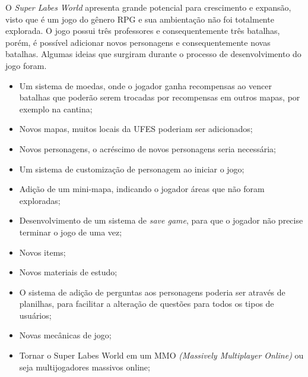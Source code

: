 
O \textit{Super Labes World} apresenta grande potencial para crescimento e expansão, visto que é um jogo do gênero RPG e sua ambientação não foi totalmente explorada. O jogo possui três professores e consequentemente três batalhas, porém, é possível adicionar novos personagens e consequentemente novas batalhas. Algumas ideias que surgiram durante o processo de desenvolvimento do jogo foram.

\begin{itemize}
    \item Um sistema de moedas, onde o jogador ganha recompensas ao vencer batalhas que poderão serem trocadas por recompensas em outros mapas, por exemplo na cantina;
    \item Novos mapas, muitos locais da UFES poderiam ser adicionados;
    \item Novos personagens, o acréscimo de novos personagens seria necessária;
    \item Um sistema de customização de personagem ao iniciar o jogo;
    \item Adição de um mini-mapa, indicando o jogador áreas que não foram exploradas;
    \item Desenvolvimento de um sistema de \textit{save game}, para que o jogador não precise terminar o jogo de uma vez;
    \item Novos items;
    \item Novos materiais de estudo;
    \item O sistema de adição de perguntas aos personagens poderia ser através de planilhas, para facilitar a alteração de questões para todos os tipos de usuários;
    \item Novas mecânicas de jogo;
    \item Tornar o Super Labes World em um MMO \textit{(Massively Multiplayer Online)} ou seja multijogadores massivos online;

\end{itemize}